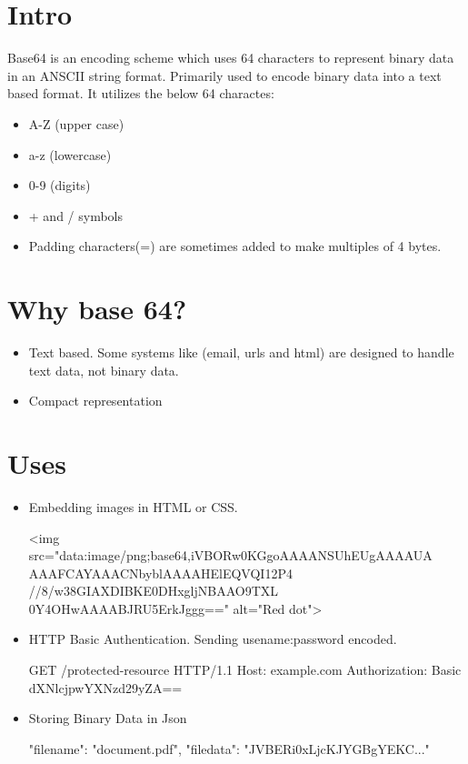 
\section{Intro}
Base64 is an encoding scheme which uses 64 characters to represent binary data in an ANSCII string format. Primarily used to encode binary data into a text based format. It utilizes the below 64 charactes: 
\begin{itemize}
    \item A-Z (upper case)
    \item a-z (lowercase)
    \item 0-9 (digits)
    \item + and / symbols
    \item Padding characters(=) are sometimes added to make multiples of 4 bytes.
\end{itemize}

\section{Why base 64?}
\begin{itemize}
    \item Text based. Some systems like (email, urls and html) are designed to handle text data, not binary data.
    \item Compact representation
\end{itemize}

\section{Uses}
\begin{itemize}
    \item Embedding images in HTML or CSS.
    \begin{lsllisting}
       <img src="data:image/png;base64,iVBORw0KGgoAAAANSUhEUgAAAAUA
        AAAFCAYAAACNbyblAAAAHElEQVQI12P4
        //8/w38GIAXDIBKE0DHxgljNBAAO9TXL
        0Y4OHwAAAABJRU5ErkJggg==" alt="Red dot">   
    \end{lsllisting}
    
    \item HTTP Basic Authentication. Sending usename:password encoded.
    \begin{lsllisting}
        GET /protected-resource HTTP/1.1
        Host: example.com
        Authorization: Basic dXNlcjpwYXNzd29yZA==
    \end{lsllisting}

    \item Storing Binary Data in Json

    \begin{lsllisting}
        {
            "filename": "document.pdf",
            "filedata": "JVBERi0xLjcKJYGBgYEKC..."
        }
    \end{lsllisting}    
\end{itemize}
